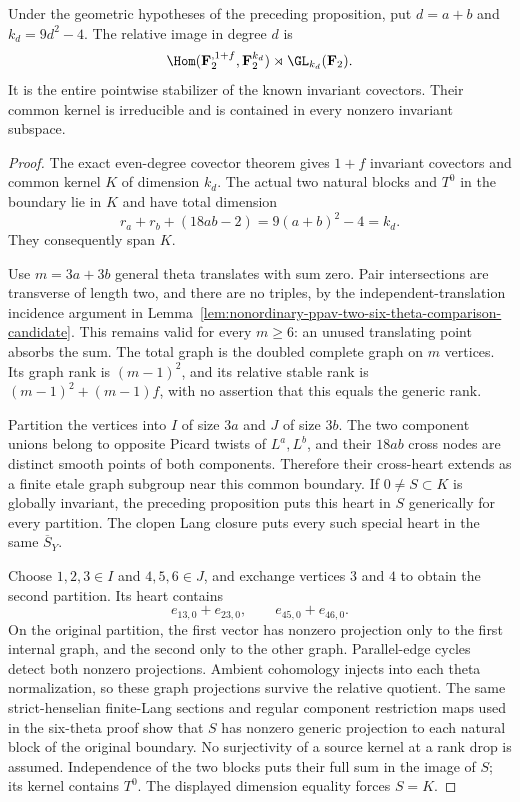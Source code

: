 \begin{theorem}
\label{thm:nonordinary-even-addition-candidate}
Under the geometric hypotheses of the preceding proposition,
put $d=a+b$ and $k_d=9d^2-4$. The relative image in degree $d$ is
\[
       \Hom(\mathbf F_2^{,1+f},\mathbf F_2^{k_d})
                               \rtimes\GL_{k_d}(\mathbf F_2).
\]
It is the entire pointwise stabilizer of the known invariant
covectors. Their common kernel is irreducible and is contained
in every nonzero invariant subspace.
\end{theorem}
\begin{proof}
The exact even-degree covector theorem gives $1+f$ invariant
covectors and common kernel $K$ of dimension $k_d$. The actual
two natural blocks and $T^0$ in the boundary lie in $K$ and
have total dimension
\[
       r_a+r_b+(18ab-2)=9(a+b)^2-4=k_d.
\]
They consequently span $K$.

Use $m=3a+3b$ general theta translates with sum zero. Pair
intersections are transverse of length two, and there are no
triples, by the independent-translation incidence argument in
Lemma~\ref{lem:nonordinary-ppav-two-six-theta-comparison-candidate}.
This remains valid for every $m\ge6$: an unused translating
point absorbs the sum. The total graph is the doubled complete
graph on $m$ vertices. Its graph rank is $(m-1)^2$, and its
relative stable rank is $(m-1)^2+(m-1)f$, with no assertion that
this equals the generic rank.

Partition the vertices into $I$ of size $3a$ and $J$ of size
$3b$. The two component unions belong to opposite Picard
twists of $L^a,L^b$, and their $18ab$ cross nodes are distinct
smooth points of both components. Therefore their cross-heart
extends as a finite etale graph subgroup near this common
boundary. If $0\ne S\subset K$ is globally invariant, the
preceding proposition puts this heart in $S$ generically for
every partition. The clopen Lang closure puts every such
special heart in the same $\overline S_Y$.

Choose $1,2,3\in I$ and $4,5,6\in J$, and exchange vertices
$3$ and $4$ to obtain the second partition. Its heart contains
\[
                  e_{13,0}+e_{23,0},\qquad
                  e_{45,0}+e_{46,0}.
\]
On the original partition, the first vector has nonzero
projection only to the first internal graph, and the second
only to the other graph. Parallel-edge cycles detect both
nonzero projections. Ambient cohomology injects into each
theta normalization, so these graph projections survive the
relative quotient. The same strict-henselian finite-Lang
sections and regular component restriction maps used in the
six-theta proof show that $S$ has nonzero generic projection
to each natural block of the original boundary. No surjectivity
of a source kernel at a rank drop is assumed. Independence
of the two blocks puts their full sum in the image of $S$;
its kernel contains $T^0$. The displayed dimension equality
forces $S=K$.


\end{proof}
